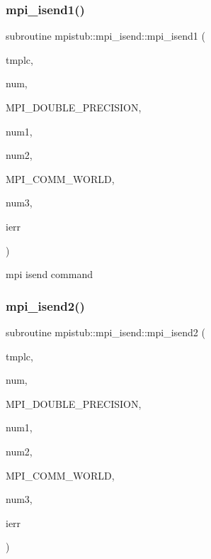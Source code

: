 \subsubsection{\texorpdfstring{mpi\_isend1()}{mpi\_isend1()}}
{\footnotesize\ttfamily subroutine mpistub\+::mpi\+\_\+isend\+::mpi\+\_\+isend1 (\begin{DoxyParamCaption}\item[{double precision, dimension(\+:)}]{tmplc,  }\item[{}]{num,  }\item[{}]{M\+P\+I\+\_\+\+D\+O\+U\+B\+L\+E\+\_\+\+P\+R\+E\+C\+I\+S\+I\+ON,  }\item[{}]{num1,  }\item[{}]{num2,  }\item[{}]{M\+P\+I\+\_\+\+C\+O\+M\+M\+\_\+\+W\+O\+R\+LD,  }\item[{}]{num3,  }\item[{}]{ierr }\end{DoxyParamCaption})}



mpi isend command 

\mbox{\label{interfacempistub_1_1mpi__isend_ae1f6f36eb6d625a18b723cd7d6f23378}} 
\subsubsection{\texorpdfstring{mpi\_isend2()}{mpi\_isend2()}}
{\footnotesize\ttfamily subroutine mpistub\+::mpi\+\_\+isend\+::mpi\+\_\+isend2 (\begin{DoxyParamCaption}\item[{double precision}]{tmplc,  }\item[{}]{num,  }\item[{}]{M\+P\+I\+\_\+\+D\+O\+U\+B\+L\+E\+\_\+\+P\+R\+E\+C\+I\+S\+I\+ON,  }\item[{}]{num1,  }\item[{}]{num2,  }\item[{}]{M\+P\+I\+\_\+\+C\+O\+M\+M\+\_\+\+W\+O\+R\+LD,  }\item[{}]{num3,  }\item[{}]{ierr }\end{DoxyParamCaption})}

\mbox{\label{interfacempistub_1_1mpi__isend_a2beb83d18f2125185679e582401f6a12}} 
